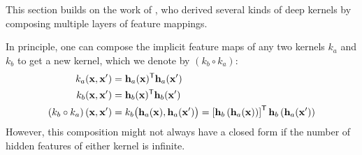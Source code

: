 This section builds on the work of \citet{cho2009kernel}, who derived several kinds of deep kernels by composing multiple layers of feature mappings.

 


In principle, one can compose the implicit feature maps of any two kernels $k_a$ and $k_b$ to get a new kernel, which we denote by $\left( k_b \circ k_a \right)$:
%
\begin{align}
k_a({\bf{x}}, {\bf{x}}') & = {\bf{h}}_a({\bf{x}}) ^{\mathsf{T}} {\bf{h}}_a({\bf{x}}') \\
k_b({\bf{x}}, {\bf{x}}') & = {\bf{h}}_b({\bf{x}}) ^{\mathsf{T}} {\bf{h}}_b({\bf{x}}') \\
\left( k_b \circ k_a \right)({\bf{x}}, {\bf{x}}') & = k_b \big({\bf{h}}_a({\bf{x}}), {\bf{h}}_a({\bf{x}}') \big) 
 = \left[ {\bf{h}}_b \left( {\bf{h}}_a({\bf{x}}) \right)\right] ^{\mathsf{T}} {\bf{h}}_b \left({\bf{h}}_a({\bf{x}}') \right)
\end{align}
%
However, this composition might not always have a closed form if the number of hidden features of either kernel is infinite.

